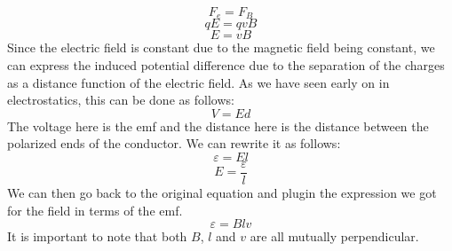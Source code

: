 \documentclass[11pt,addpoints]{exam}
\begin{document}
 $$F_e=F_B$$
 $$qE=qvB$$
 $$E=vB$$
 Since the electric field is constant due to the magnetic field being constant, we can express the induced potential difference due to the separation of the charges as a distance function of the electric field. As we have seen early on in electrostatics, this can be done as follows:
 $$V=Ed$$
 The voltage here is the emf and the distance here is the distance between the polarized ends of the conductor. We can rewrite it as follows:
 $$\varepsilon=El$$
 $$E=\dfrac{\varepsilon}{l}$$
 We can then go back to the original equation and plugin the expression we got for the field in terms of the emf.
 $$\varepsilon=Blv$$
 It is important to note that both $B$, $l$ and $v$ are all mutually perpendicular.
\end{document}
